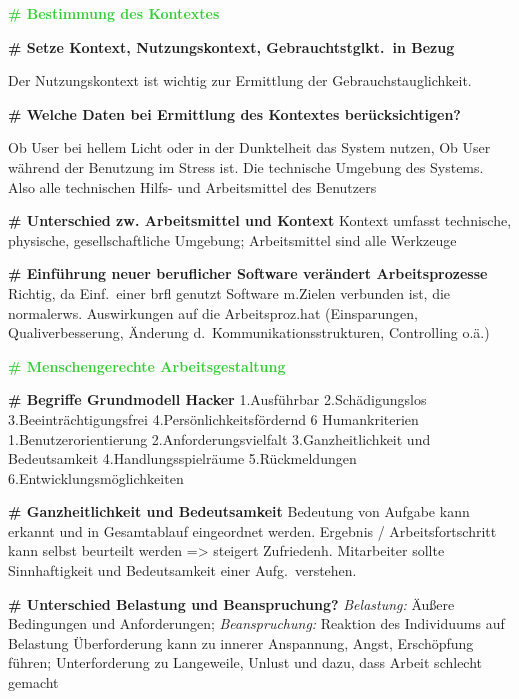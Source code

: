 \documentclass{article}
\begin{document}
\ttfamily

\begin{multicols}{3}
	\begin{flushleft}
		\begin{tiny}
			\textcolor{LimeGreen}{\textbf{\scriptsize{\# Bestimmung des
				Kontextes}}}

			\textbf{\# Setze Kontext, Nutzungskontext, Gebrauchtstglkt.\ in
				Bezug}

			Der Nutzungskontext ist wichtig zur Ermittlung der
			Gebrauchstauglichkeit.

			\textbf{\# Welche Daten bei Ermittlung des Kontextes
				berücksichtigen?}

			Ob User bei hellem Licht oder in der Dunktelheit das System nutzen,
			Ob User während der Benutzung im Stress ist. Die technische
			Umgebung des Systems. Also alle technischen Hilfs- und
			Arbeitsmittel des Benutzers

			\textbf{\# Unterschied zw. Arbeitsmittel und Kontext}
			Kontext umfasst technische, physische,
			gesellschaftliche Umgebung; Arbeitsmittel
			sind alle Werkzeuge

			\textbf{\# Einführung neuer beruflicher Software verändert
				Arbeitsprozesse}
			Richtig, da Einf.\ einer brfl genutzt Software m.Zielen
			verbunden ist, die normalerws. Auswirkungen auf die
			Arbeitsproz.hat (Einsparungen, Qualiverbesserung, Änderung d.\
			Kommunikationsstrukturen, Controlling o.ä.)

			\textcolor{LimeGreen}{\textbf{\scriptsize{\# Menschengerechte
				Arbeitsgestaltung}}}

			\textbf{\# Begriffe Grundmodell Hacker}
			1.Ausführbar
			2.Schädigungslos
			3.Beeinträchtigungsfrei
			4.Persönlichkeitsfördernd
			6 Humankriterien
			1.Benutzerorientierung
			2.Anforderungsvielfalt
			3.Ganzheitlichkeit und Bedeutsamkeit
			4.Handlungsspielräume
			5.Rückmeldungen
			6.Entwicklungsmöglichkeiten

			\textbf{\# Ganzheitlichkeit und Bedeutsamkeit}
			Bedeutung von Aufgabe kann erkannt und in Gesamtablauf eingeordnet
			werden. Ergebnis / Arbeitsfortschritt kann selbst beurteilt werden
			=> steigert Zufriedenh. Mitarbeiter sollte Sinnhaftigkeit und
			Bedeutsamkeit einer Aufg.\ verstehen.

			\textbf{\# Unterschied Belastung und Beanspruchung?}
			\textit{Belastung:} Äußere Bedingungen und Anforderungen;
			\textit{Beanspruchung:} Reaktion des Individuums auf Belastung
			Überforderung kann zu innerer Anspannung, Angst, Erschöpfung
			führen; Unterforderung zu Langeweile, Unlust und dazu, dass Arbeit
			schlecht gemacht


\end{tiny}
\end{flushleft}
\end{multicols}
\end{document}

